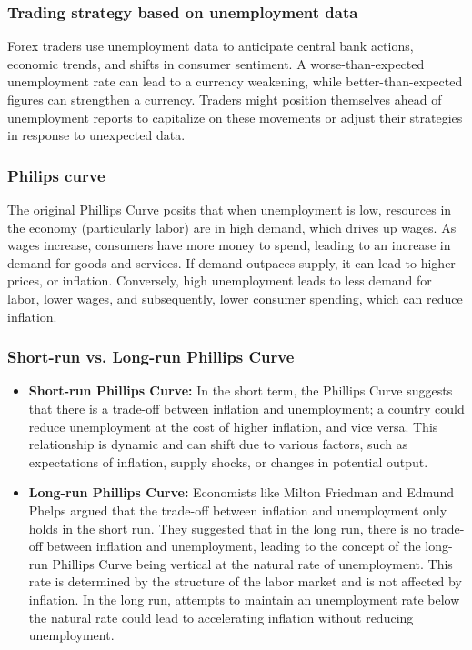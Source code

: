 \documentclass{report}
\begin{document}
     \subsubsection{Trading strategy based on unemployment data}
     \bigbreak \noindent 
     Forex traders use unemployment data to anticipate central bank actions, economic trends, and shifts in consumer sentiment. A worse-than-expected unemployment rate can lead to a currency weakening, while better-than-expected figures can strengthen a currency. Traders might position themselves ahead of unemployment reports to capitalize on these movements or adjust their strategies in response to unexpected data.


     \bigbreak \noindent 
     \subsubsection{Philips curve}
     \bigbreak \noindent 
     The original Phillips Curve posits that when unemployment is low, resources in the economy (particularly labor) are in high demand, which drives up wages. As wages increase, consumers have more money to spend, leading to an increase in demand for goods and services. If demand outpaces supply, it can lead to higher prices, or inflation. Conversely, high unemployment leads to less demand for labor, lower wages, and subsequently, lower consumer spending, which can reduce inflation.

     \bigbreak \noindent 
     \subsubsection{Short-run vs. Long-run Phillips Curve}
     \begin{itemize}
         \item \textbf{Short-run Phillips Curve:} In the short term, the Phillips Curve suggests that there is a trade-off between inflation and unemployment; a country could reduce unemployment at the cost of higher inflation, and vice versa. This relationship is dynamic and can shift due to various factors, such as expectations of inflation, supply shocks, or changes in potential output.
         \item \textbf{Long-run Phillips Curve:} Economists like Milton Friedman and Edmund Phelps argued that the trade-off between inflation and unemployment only holds in the short run. They suggested that in the long run, there is no trade-off between inflation and unemployment, leading to the concept of the long-run Phillips Curve being vertical at the natural rate of unemployment. This rate is determined by the structure of the labor market and is not affected by inflation. In the long run, attempts to maintain an unemployment rate below the natural rate could lead to accelerating inflation without reducing unemployment.
     \end{itemize}
\end{document}
